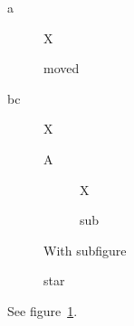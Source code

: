 \documentclass{article}
\begin{document}
a\clearpage
\begin{figure}[p] X\caption{moved}\end{figure}
b\clearpage c\clearpage
\begin{figure}[t] X\caption{A}\label{f}\end{figure}
\begin{table}[h]\caption{A table}\end{table}
\begin{figure}[H]
  \begin{subfigure}{.4\linewidth}X\caption{sub}\end{subfigure}
  \caption{With subfigure}
\end{figure}
\begin{figure}\caption*{star}\end{figure}
See figure~\ref{f}.
\end{document}
